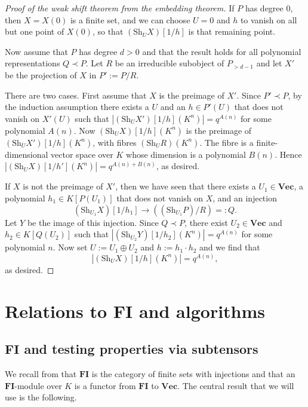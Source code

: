 \documentclass{amsart}
\renewcommand{\Vec}{\mathbf{Vec}}
\newcommand{\Sh}{\mathrm{Sh}}
\newcommand{\FI}{\mathbf{FI}}
\begin{document}
\begin{proof}[Proof of the weak shift theorem from the embedding theorem]
If $P$ has degree $0$, then $X=X(0)$ is a finite set, and we can choose
$U=0$ and $h$ to vanish on all but one point of $X(0)$, so that $(\Sh_U
X)[1/h]$ is that remaining point.

Now assume that $P$ has degree $d>0$ and that the result holds for
all polynomial representations $Q \prec P$. Let $R$ be an irreducible
subobject of $P_{>d-1}$ and let $X'$ be the projection of $X$ in
$P':=P/R$. 

There are two cases. First assume that $X$ is the preimage of $X'$.
Since $P' \prec P$, by the induction assumption there exists a $U$ and
an $h \in P'(U)$ that does not vanish on $X'(U)$ such that $|(\Sh_{U}
X')[1/h](K^n)|=q^{A(n)}$ for some polynomial $A(n)$.  Now $(\Sh_U
X)[1/h](K^n)$ is the preimage of $(\Sh_U X')[1/h](K^n)$, with fibres
$(\Sh_U R)(K^n)$. The fibre is a finite-dimensional vector space
over $K$ whose dimension is a polynomial $B(n)$. Hence $|(\Sh_{U}
X)[1/h'](K^n)|=q^{A(n)+B(n)}$, as desired.

If $X$ is not the preimage of $X'$, then we have seen that there exists
a $U_1 \in \Vec$, a polynomial $h_1 \in K[P(U_1)]$ that does not vanish on $X$,
and an injection
\[ (\Sh_{U_1} X)[1/h_1] \to ((\Sh_{U_1} P)/R)=:Q. \]
Let $Y$ be the image of this injection. Since $Q \prec P$, there
exist $U_2 \in \Vec$ and $h_2 \in K[Q(U_2)]$ such that $|(\Sh_{U_2}
Y)[1/h_2](K^n)|=q^{A(n)}$ for some polynomial $n$. Now set $U:=U_1 \oplus
U_2$ and $h:=h_1 \cdot h_2$ and we find that 
\[ |(\Sh_U X)[1/h](K^n)|=q^{A(n)}, \]
as desired. 
\end{proof}





\section{Relations to $\FI$ and algorithms} \label{sec:FI}

\subsection{$\FI$ and testing properties via subtensors}
\label{ssec:FI}

We recall from \cite{Church12} that $\FI$ is the category of finite sets
with injections and that an $\FI$-module over $K$ is a functor from $\FI$
to $\Vec$. The central result that we will use is the following.
\end{document}
